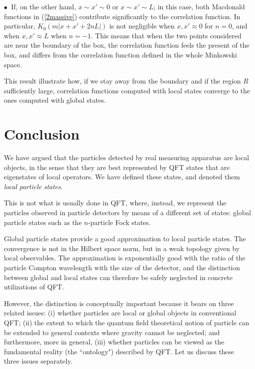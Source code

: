 \documentclass[11pt, nofootinbib]{revtex4-2}
\begin{document}
$\bullet\ $ If, on the other hand, $x \sim x' \sim 0$ or $x \sim x' \sim L$; in
this case, both Macdonald functions in (\ref{2massive}) contribute
significantly to the correlation function.  In particular, $K_0(m
|x+x'+2nL|)$ is not negligible when $x,x' \approx 0$ for $n=0$, and
when $x,x' \approx L$ when $n=-1$.  This means that when the two
points considered are near the boundary of the box, the correlation
function feels the present of the box, and differs from the
correlation function defined in the whole Minkowski space.

This result illustrate how, if we stay away from the boundary and if
the region $R$ sufficiently large, correlation functions computed
with local states converge to the ones computed with global states. 


\section{Conclusion}

We have argued that the particles detected by real measuring apparatus
are local objects, in the sense that they are best represented by QFT
states that are eigenstates of local operators.  We have defined these
states, and denoted them \emph{local particle states}.

This is not what is usually done in QFT, where, instead, we represent
the particles observed in particle detectors by means of a different
set of states: global particle states such as the $n$-particle
Fock states.  

Global particle states provide a good approximation to local particle
states.  The convergence is not in the Hilbert space norm, but in
a weak topology given by local observables.  The approximation is
exponentially good with the ratio of the particle Compton wavelength
with the size of the detector, and the distinction between global and
local states can therefore be safely neglected in concrete
utilizations of QFT. 

However, the distinction is conceptually important because it bears on
three related issues: (i) whether particles are local or global
objects in conventional QFT; (ii) the extent to which the quantum
field theoretical notion of particle can be extended to general
contexts where gravity cannot be neglected; and furthermore, more in
general, (iii) whether particles can be viewed as
the fundamental reality (the ``ontology") described by QFT. Let us
discuss these three issues separately.
\end{document}
